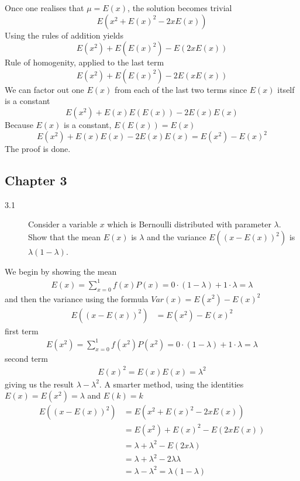 \documentclass[10pt,a4paper]{article}
\newenvironment{prob}[1]%
   {%
    \begin{description}\item[#1]}%
   {\end{description}}
\begin{document}
Once one realises that $\mu = E(x)$, the solution becomes trivial
\begin{equation}
  E(x^2 + E(x)^2 - 2xE(x))
\end{equation}
Using the rules of addition yields
\begin{equation}
  E(x^2) + E(E(x)^2) - E(2xE(x))
\end{equation}
Rule of homogenity, applied to the last term
\begin{equation}
  E(x^2) + E(E(x)^2) - 2E(xE(x))
\end{equation}
We can factor out one $E(x)$ from each of the last two terms since
$E(x)$ itself is a constant
\begin{equation}
  E(x^2) + E(x)E(E(x)) - 2E(x)E(x)
\end{equation}
Because $E(x)$ is a constant, $E(E(x)) = E(x)$
\begin{equation}
  E(x^2) + E(x)E(x) - 2E(x)E(x) = E(x^2) - E(x)^2
\end{equation}
The proof is done.
\subsection{Chapter 3}
\begin{prob}{3.1}
  Consider a variable $x$ which is Bernoulli distributed with
  parameter $\lambda$. Show that the mean $E(x)$ is $\lambda$ and the
  variance $E((x - E(x))^2)$ is $\lambda(1 - \lambda)$.
\end{prob}
We begin by showing the mean
\begin{align}
  E(x) = \sum_{x=0}^1f(x)P(x) = 0\cdot(1-\lambda) + 1\cdot\lambda = \lambda
\end{align}
and then the variance using the formula $Var(x) = E(x^2) - E(x)^2$
\begin{align}
  E((x - E(x))^2) &= E(x^2) - E(x)^2
\end{align}
first term
\begin{align}
  E(x^2) = \sum_{x=0}^1f(x^2)P(x^2) = 0\cdot(1-\lambda) + 1\cdot\lambda = \lambda
\end{align}
second term
\begin{align}
  E(x)^2 = E(x)E(x) = \lambda^2
\end{align}
giving us the result $\lambda - \lambda^2$. A smarter method, using
the identities $E(x) = E(x^2) = \lambda$ and $E(k) = k$
\begin{align}
  E((x-E(x))^2) &= E(x^2 + E(x)^2 - 2xE(x))\\
  &= E(x^2) + E(x)^2 - E(2xE(x))\\
  &= \lambda + \lambda^2 - E(2x\lambda)\\
  &= \lambda + \lambda^2 - 2\lambda\lambda\\
  &= \lambda - \lambda^2 = \lambda(1-\lambda)
\end{align}
\end{document}
